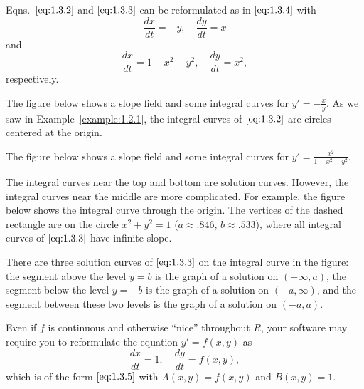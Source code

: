 \documentclass{ximera}
\begin{document}
Eqns.~$\eqref{eq:1.3.2}$ and $\eqref{eq:1.3.3}$ can be reformulated as in
$\eqref{eq:1.3.4}$ with
$$
\frac{dx}{dt}=-y,\quad \frac{dy}{dt}=x
$$
and
$$
\frac{dx}{dt}=1-x^2-y^2,\quad \frac{dy}{dt}=x^2,
$$
respectively.
 
The figure below shows a slope field and some integral curves
for $y'=-\frac{x}{y}$. As we saw in
Example~\ref{example:1.2.1}, the integral curves of $\eqref{eq:1.3.2}$
are circles centered at the origin.

\begin{center}  
\end{center}

 
The figure below shows a slope field and some integral curves
for $y'=\frac{x^2}{1-x^2-y^2}$.

\begin{center}  
\end{center}


The integral curves near the top and bottom are
solution curves. However, the integral curves near the middle are more
complicated. For example, the figure below shows the integral
curve through the origin. The vertices of the dashed rectangle are on
the circle $x^2+y^2=1$ ($a\approx.846$, $b\approx.533$), where all
integral curves of $\eqref{eq:1.3.3}$ have infinite slope.

\begin{center}  
\end{center}

There are
three solution curves of $\eqref{eq:1.3.3}$ on the integral curve in the
figure: the segment above the level $y=b$ is the graph of a solution
on $(-\infty,a)$, the segment below the level $y=-b$ is the graph of a
solution on $(-a,\infty)$, and the segment between these two levels is
the graph of a solution on $(-a,a)$.
 
Even if $f$ is continuous and otherwise ``nice''
throughout $R$, your software  may require you to
reformulate the equation $y'=f(x,y)$ as
$$
\frac{dx}{dt}=1,\quad \frac{dy}{dt}=f(x,y),
$$
which is of the form $\eqref{eq:1.3.5}$ with $A(x,y)=f(x,y)$ and
$B(x,y)=1$.
 
\end{document}
